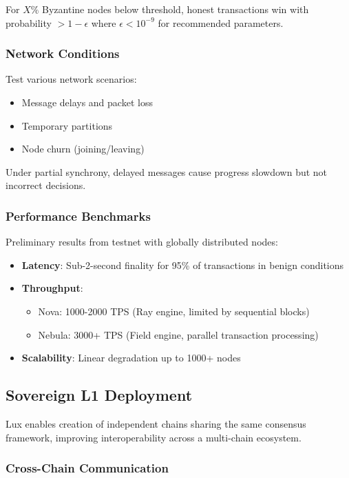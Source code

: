 For $X\%$ Byzantine nodes below threshold, honest transactions win with probability $> 1-\epsilon$ where $\epsilon < 10^{-9}$ for recommended parameters.

\subsubsection{Network Conditions}

Test various network scenarios:
\begin{itemize}
\item Message delays and packet loss
\item Temporary partitions
\item Node churn (joining/leaving)
\end{itemize}

Under partial synchrony, delayed messages cause progress slowdown but not incorrect decisions.

\subsubsection{Performance Benchmarks}

Preliminary results from testnet with globally distributed nodes:
\begin{itemize}
\item \textbf{Latency}: Sub-2-second finality for 95\% of transactions in benign conditions
\item \textbf{Throughput}: 
  \begin{itemize}
  \item Nova: 1000-2000 TPS (Ray engine, limited by sequential blocks)
  \item Nebula: 3000+ TPS (Field engine, parallel transaction processing)
  \end{itemize}
\item \textbf{Scalability}: Linear degradation up to 1000+ nodes
\end{itemize}

\subsection{Sovereign L1 Deployment}

Lux enables creation of independent chains sharing the same consensus framework, improving interoperability across a multi-chain ecosystem.

\subsubsection{Cross-Chain Communication}

